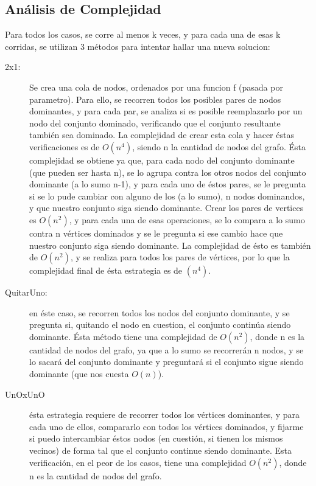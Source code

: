 \subsection{Análisis de Complejidad}
Para todos los casos, se corre al menos k veces, y para cada una de esas k corridas, se utilizan 3 métodos para intentar hallar una nueva solucion:
\begin{description}
\item[2x1:] Se crea una cola de nodos, ordenados por una funcion f (pasada por parametro). Para ello, se recorren todos los posibles pares de nodos dominantes, y para cada par, se analiza si es posible reemplazarlo por un nodo del conjunto dominado, verificando que el conjunto resultante también sea dominado. La complejidad de crear esta cola y hacer éstas verificaciones es de $O(n^4)$, siendo n la cantidad de nodos del grafo. Ésta complejidad se obtiene ya que, para cada nodo del conjunto dominante (que pueden ser hasta n), se lo agrupa contra los otros nodos del conjunto dominante (a lo sumo n-1), y para cada uno de éstos pares, se le pregunta si se lo pude cambiar con alguno de los (a lo sumo), n nodos dominandos, y que nuestro conjunto siga siendo dominante. Crear los pares de vertices es $O(n^2)$, y para cada una de esas operaciones, se lo compara a lo sumo contra n vértices dominados y se le pregunta si ese cambio hace que nuestro conjunto siga siendo dominante. La complejidad de ésto es también de $O(n^2)$, y se realiza para todos los pares de vértices, por lo que la complejidad final de ésta estrategia es de $(n^4)$.
\item[QuitarUno:] en éste caso, se recorren todos los nodos del conjunto dominante, y se pregunta si, quitando el nodo en cuestion, el conjunto continúa siendo dominante. Ésta método tiene una complejidad de $O(n^2)$, donde n es la cantidad de nodos del grafo, ya que a lo sumo se recorrerán n nodos, y se lo sacará del conjunto dominante y preguntará si el conjunto sigue siendo dominante (que nos cuesta $O(n)$).
 \item[UnOxUnO] ésta estrategia requiere de recorrer todos los vértices dominantes, y para cada uno de ellos, compararlo con todos los vértices dominados, y fijarme si puedo intercambiar éstos nodos (en cuestión, si tienen los mismos vecinos) de forma tal que el conjunto continue siendo dominante. Esta verificación, en el peor de los casos, tiene una complejidad $O(n^2)$, donde n es la cantidad de nodos del grafo.
\end{description}
 
